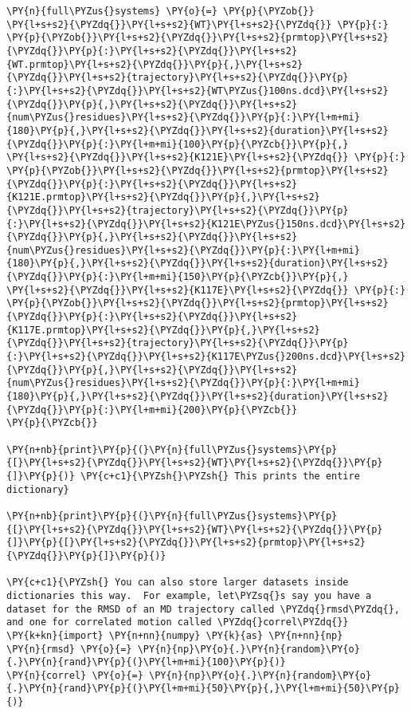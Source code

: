 \begin{tcolorbox}[breakable, size=fbox, boxrule=1pt, pad at break*=1mm,colback=cellbackground, colframe=cellborder]
\begin{Verbatim}[commandchars=\\\{\}]
\PY{n}{full\PYZus{}systems} \PY{o}{=} \PY{p}{\PYZob{}}
\PY{l+s+s2}{\PYZdq{}}\PY{l+s+s2}{WT}\PY{l+s+s2}{\PYZdq{}} \PY{p}{:} \PY{p}{\PYZob{}}\PY{l+s+s2}{\PYZdq{}}\PY{l+s+s2}{prmtop}\PY{l+s+s2}{\PYZdq{}}\PY{p}{:}\PY{l+s+s2}{\PYZdq{}}\PY{l+s+s2}{WT.prmtop}\PY{l+s+s2}{\PYZdq{}}\PY{p}{,}\PY{l+s+s2}{\PYZdq{}}\PY{l+s+s2}{trajectory}\PY{l+s+s2}{\PYZdq{}}\PY{p}{:}\PY{l+s+s2}{\PYZdq{}}\PY{l+s+s2}{WT\PYZus{}100ns.dcd}\PY{l+s+s2}{\PYZdq{}}\PY{p}{,}\PY{l+s+s2}{\PYZdq{}}\PY{l+s+s2}{num\PYZus{}residues}\PY{l+s+s2}{\PYZdq{}}\PY{p}{:}\PY{l+m+mi}{180}\PY{p}{,}\PY{l+s+s2}{\PYZdq{}}\PY{l+s+s2}{duration}\PY{l+s+s2}{\PYZdq{}}\PY{p}{:}\PY{l+m+mi}{100}\PY{p}{\PYZcb{}}\PY{p}{,}
\PY{l+s+s2}{\PYZdq{}}\PY{l+s+s2}{K121E}\PY{l+s+s2}{\PYZdq{}} \PY{p}{:} \PY{p}{\PYZob{}}\PY{l+s+s2}{\PYZdq{}}\PY{l+s+s2}{prmtop}\PY{l+s+s2}{\PYZdq{}}\PY{p}{:}\PY{l+s+s2}{\PYZdq{}}\PY{l+s+s2}{K121E.prmtop}\PY{l+s+s2}{\PYZdq{}}\PY{p}{,}\PY{l+s+s2}{\PYZdq{}}\PY{l+s+s2}{trajectory}\PY{l+s+s2}{\PYZdq{}}\PY{p}{:}\PY{l+s+s2}{\PYZdq{}}\PY{l+s+s2}{K121E\PYZus{}150ns.dcd}\PY{l+s+s2}{\PYZdq{}}\PY{p}{,}\PY{l+s+s2}{\PYZdq{}}\PY{l+s+s2}{num\PYZus{}residues}\PY{l+s+s2}{\PYZdq{}}\PY{p}{:}\PY{l+m+mi}{180}\PY{p}{,}\PY{l+s+s2}{\PYZdq{}}\PY{l+s+s2}{duration}\PY{l+s+s2}{\PYZdq{}}\PY{p}{:}\PY{l+m+mi}{150}\PY{p}{\PYZcb{}}\PY{p}{,}
\PY{l+s+s2}{\PYZdq{}}\PY{l+s+s2}{K117E}\PY{l+s+s2}{\PYZdq{}} \PY{p}{:} \PY{p}{\PYZob{}}\PY{l+s+s2}{\PYZdq{}}\PY{l+s+s2}{prmtop}\PY{l+s+s2}{\PYZdq{}}\PY{p}{:}\PY{l+s+s2}{\PYZdq{}}\PY{l+s+s2}{K117E.prmtop}\PY{l+s+s2}{\PYZdq{}}\PY{p}{,}\PY{l+s+s2}{\PYZdq{}}\PY{l+s+s2}{trajectory}\PY{l+s+s2}{\PYZdq{}}\PY{p}{:}\PY{l+s+s2}{\PYZdq{}}\PY{l+s+s2}{K117E\PYZus{}200ns.dcd}\PY{l+s+s2}{\PYZdq{}}\PY{p}{,}\PY{l+s+s2}{\PYZdq{}}\PY{l+s+s2}{num\PYZus{}residues}\PY{l+s+s2}{\PYZdq{}}\PY{p}{:}\PY{l+m+mi}{180}\PY{p}{,}\PY{l+s+s2}{\PYZdq{}}\PY{l+s+s2}{duration}\PY{l+s+s2}{\PYZdq{}}\PY{p}{:}\PY{l+m+mi}{200}\PY{p}{\PYZcb{}} 
\PY{p}{\PYZcb{}}

\PY{n+nb}{print}\PY{p}{(}\PY{n}{full\PYZus{}systems}\PY{p}{[}\PY{l+s+s2}{\PYZdq{}}\PY{l+s+s2}{WT}\PY{l+s+s2}{\PYZdq{}}\PY{p}{]}\PY{p}{)} \PY{c+c1}{\PYZsh{}\PYZsh{} This prints the entire dictionary}

\PY{n+nb}{print}\PY{p}{(}\PY{n}{full\PYZus{}systems}\PY{p}{[}\PY{l+s+s2}{\PYZdq{}}\PY{l+s+s2}{WT}\PY{l+s+s2}{\PYZdq{}}\PY{p}{]}\PY{p}{[}\PY{l+s+s2}{\PYZdq{}}\PY{l+s+s2}{prmtop}\PY{l+s+s2}{\PYZdq{}}\PY{p}{]}\PY{p}{)}

\PY{c+c1}{\PYZsh{} You can also store larger datasets inside dictionaries this way.  For example, let\PYZsq{}s say you have a dataset for the RMSD of an MD trajectory called \PYZdq{}rmsd\PYZdq{}, and one for correlated motion called \PYZdq{}correl\PYZdq{}}
\PY{k+kn}{import} \PY{n+nn}{numpy} \PY{k}{as} \PY{n+nn}{np}
\PY{n}{rmsd} \PY{o}{=} \PY{n}{np}\PY{o}{.}\PY{n}{random}\PY{o}{.}\PY{n}{rand}\PY{p}{(}\PY{l+m+mi}{100}\PY{p}{)}
\PY{n}{correl} \PY{o}{=} \PY{n}{np}\PY{o}{.}\PY{n}{random}\PY{o}{.}\PY{n}{rand}\PY{p}{(}\PY{l+m+mi}{50}\PY{p}{,}\PY{l+m+mi}{50}\PY{p}{)}


\end{Verbatim}
\end{tcolorbox}
